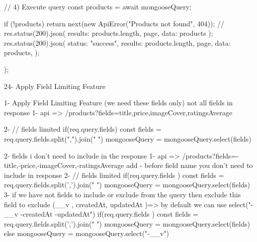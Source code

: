 {                                                    // 4) Execute query
                                                    const products = await mongooseQuery;

                                                    if (!products) {
                                                        return next(new ApiError("Products not found", 404));
                                                    }
                                                    // res.status(200).json({ results: products.length, page, data: products });
                                                    res.status(200).json({
                                                        status: "success",
                                                        results: products.length,
                                                        page,
                                                        data: products,
                                                    });
                                    });


24- Apply Field Limiting Feature

        1- Apply Field Limiting Feature (we need these fields only) not all fields in response
            1- api => /products?fields=title,price,imageCover,ratingsAverage

            2- // fields limited
                    if(req.query.fields){
                        const fields = req.query.fields.split(",").join(" ")
                        mongooseQuery = mongooseQuery.select(fields)
                    }
        
        2- fields i don't need to include in the response
            1- api => /products?fields=-title,-price,-imageCover,-ratingsAverage
                        add - before field name you don't need to include in response
            2- // fields limited
                if(req.query.fields ){
                    const fields = req.query.fields.split(',').join(" ")
                    mongooseQuery = mongooseQuery.select(fields)
                }
        3- if we have not fields to include or exclude from the query then exclude this field
            to exclude (__v , createdAt, updatedAt )=> by default we can use select("-__v -createdAt -updatedAt")
             if(req.query.fields ){
                    const fields = req.query.fields.split(',').join(" ")
                    mongooseQuery = mongooseQuery.select(fields)
                }else{
                    mongooseQuery = mongooseQuery.select("-__v")
                }

